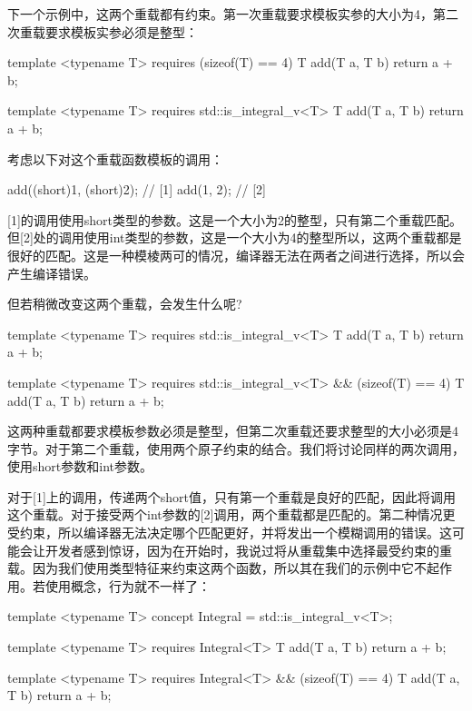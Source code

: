 下一个示例中，这两个重载都有约束。第一次重载要求模板实参的大小为4，第二次重载要求模板实参必须是整型：

\begin{cpp}
template <typename T>
requires (sizeof(T) == 4)
T add(T a, T b)
{
	return a + b;
}

template <typename T>
requires std::is_integral_v<T>
T add(T a, T b)
{
	return a + b;
}
\end{cpp}

考虑以下对这个重载函数模板的调用：

\begin{cpp}
add((short)1, (short)2); // [1]
add(1, 2); // [2]
\end{cpp}

[1]的调用使用short类型的参数。这是一个大小为2的整型，只有第二个重载匹配。但[2]处的调用使用int类型的参数，这是一个大小为4的整型所以，这两个重载都是很好的匹配。这是一种模棱两可的情况，编译器无法在两者之间进行选择，所以会产生编译错误。

但若稍微改变这两个重载，会发生什么呢?

\begin{cpp}
template <typename T>
requires std::is_integral_v<T>
T add(T a, T b)
{
	return a + b;
}

template <typename T>
requires std::is_integral_v<T> && (sizeof(T) == 4)
T add(T a, T b)
{
	return a + b;
}
\end{cpp}

这两种重载都要求模板参数必须是整型，但第二次重载还要求整型的大小必须是4字节。对于第二个重载，使用两个原子约束的结合。我们将讨论同样的两次调用，使用short参数和int参数。

对于[1]上的调用，传递两个short值，只有第一个重载是良好的匹配，因此将调用这个重载。对于接受两个int参数的[2]调用，两个重载都是匹配的。第二种情况更受约束，所以编译器无法决定哪个匹配更好，并将发出一个模糊调用的错误。这可能会让开发者感到惊讶，因为在开始时，我说过将从重载集中选择最受约束的重载。因为我们使用类型特征来约束这两个函数，所以其在我们的示例中它不起作用。若使用概念，行为就不一样了：

\begin{cpp}
template <typename T>
concept Integral = std::is_integral_v<T>;

template <typename T>
requires Integral<T>
T add(T a, T b)
{
	return a + b;
}

template <typename T>
requires Integral<T> && (sizeof(T) == 4)
T add(T a, T b)
{
	return a + b;
}
\end{cpp}

